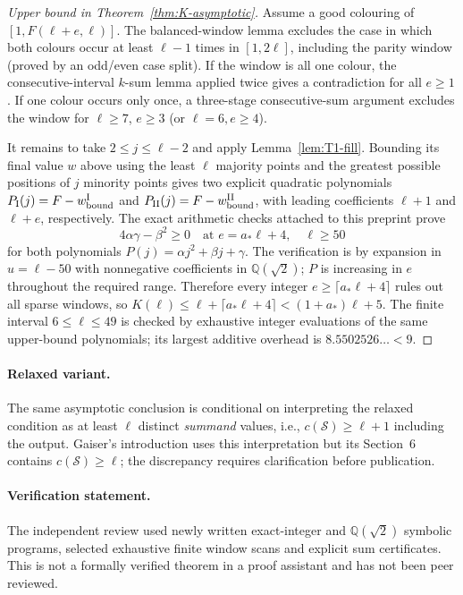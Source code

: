 \begin{proof}[Upper bound in Theorem~\ref{thm:K-asymptotic}]
Assume a good colouring of $[1,F(\ell+e,\ell)]$.
The balanced-window lemma excludes the case in which both colours
occur at least $\ell-1$ times in $[1,2\ell]$, including the parity
window (proved by an odd/even case split). If the window is all one
colour, the consecutive-interval $k$-sum lemma applied twice gives
a contradiction for all $e\ge1$. If one colour occurs only once,
a three-stage consecutive-sum argument excludes the window for
$\ell\ge7$, $e\ge3$ (or $\ell=6,e\ge4$).

It remains to take $2\le j\le\ell-2$ and apply
Lemma~\ref{lem:T1-fill}. Bounding its final value $w$ above using
the least $\ell$ majority points and the greatest possible positions
of $j$ minority points gives two explicit quadratic polynomials
$P_{\rm I}(j)=F-w_{\rm bound}^{\rm I}$ and
$P_{\rm II}(j)=F-w_{\rm bound}^{\rm II}$, with leading
coefficients $\ell+1$ and $\ell+e$, respectively. The exact
arithmetic checks attached to this preprint prove
\[
 4\alpha\gamma-\beta^2\ge0
 \quad\text{at }e=a_*\ell+4,\quad\ell\ge50
\]
for both polynomials $P(j)=\alpha j^2+\beta j+\gamma$.
The verification is by expansion in $u=\ell-50$ with nonnegative
coefficients in $\mathbb Q(\sqrt2)$; $P$ is increasing in $e$
throughout the required range. Therefore every integer
$e\ge\lceil a_*\ell+4\rceil$ rules out all sparse windows,
so $K(\ell)\le\ell+\lceil a_*\ell+4\rceil
<(1+a_*)\ell+5$.
The finite interval $6\le\ell\le49$ is checked by exhaustive
integer evaluations of the same upper-bound polynomials; its largest
additive overhead is $8.5502526\ldots<9$.
\end{proof}

\paragraph{Relaxed variant.}
The same asymptotic conclusion is conditional on interpreting the
relaxed condition as at least $\ell$ distinct \emph{summand} values,
i.e., $c(\mathcal S)\ge\ell+1$ including the output.
Gaiser's introduction uses this interpretation but its Section~6
contains $c(\mathcal S)\ge\ell$; the discrepancy requires
clarification before publication.

\paragraph{Verification statement.}
The independent review used newly written exact-integer and
$\mathbb Q(\sqrt2)$ symbolic programs, selected exhaustive finite
window scans and explicit sum certificates. This is not a formally
verified theorem in a proof assistant and has not been peer reviewed.
